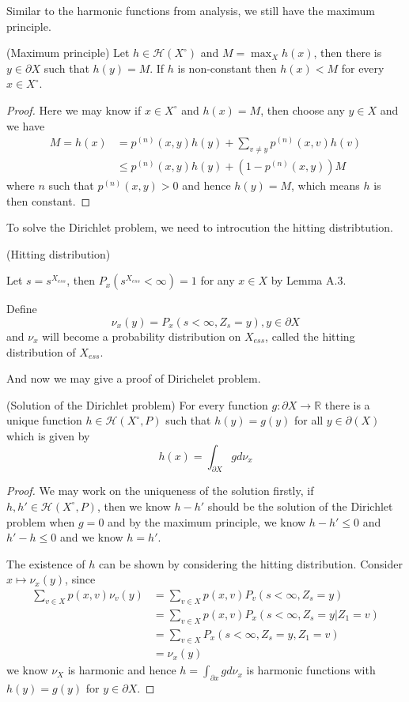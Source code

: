 \documentclass[lang=en,11pt,a4paper,citestyle =authoryear]{elegantpaper}
\newcommand{\R}{\mathbb{R}}
\newcommand{\Har}{\mathcal{H}}
\begin{document}
Similar to the harmonic functions from analysis, we still have the maximum principle.

\begin{theorem}
    (Maximum principle) Let $h \in \Har(X^{\circ})$ and $M = \max_X h(x)$, then there is $y\in \partial X$ such that $h(y) = M$. If $h$ is non-constant then $h(x) < M$ for every $x\in X^{\circ}$.
\end{theorem}
\begin{proof}
    Here we may know if $x\in X^{\circ}$ and $h(x) = M$, then choose any $y\in X$ and we have
    \[
    \begin{aligned}
    M = h(x) &= p^{(n)}(x,y)h(y) + \sum\limits_{v\neq y}p^{(n)}(x,v)h(v) \\
    &\leq p^{(n)}(x,y)h(y) + (1-p^{(n)}(x,y))M
    \end{aligned}
    \]
    where $n$ such that $p^{(n)}(x,y) > 0$ and hence $h(y) = M$, which means $h$ is then constant.
\end{proof}

To solve the Dirichlet problem, we need to introcution the hitting distribtution.

\begin{definition}
    (Hitting distribution)\par
    Let $s = s^{X_{ess}}$, then $P_x(s^{X_{ess}} < \infty) = 1$ for any $x\in X$ by Lemma A.3.\par
    Define
    \[\nu_x(y)  = P_x(s<\infty, Z_s = y), y\in\partial X\]
    and $\nu_x$ will become a probability distribution on $X_{ess}$, called the hitting distribution of $X_{ess}$.
\end{definition}

And now we may give a proof of Dirichelet problem.

\begin{theorem}
    (Solution of the Dirichlet problem) For every function $g:\partial X\to \R$ there is a unique function $h\in \Har(X^{\circ},P)$ such that $h(y) = g(y)$ for all $y\in \partial(X)$ which is given by
    \[
    h(x) = \int_{\partial X} gd\nu_x
    \]
\end{theorem}
\begin{proof}
    We may work on the uniqueness of the solution firstly, if $h,h' \in \Har(X^{\circ}, P)$, then we know $h - h'$ should be the solution of the  Dirichlet problem when $g = 0$ and by the maximum principle, we know $h-h' \leq 0$ and $h'-h\leq 0$ and we know $ h = h'$.\par
    The existence of $h$ can be shown by considering the hitting distribution. Consider $x\mapsto \nu_x(y)$, since
    \[
    \begin{aligned}
    \sum\limits_{v\in X}p(x,v)\nu_v(y) &= \sum\limits_{v\in X}p(x,v)P_v(s<\infty, Z_s = y)\\ &= \sum\limits_{v\in X}p(x,v)P_x(s<\infty, Z_s = y|Z_1 = v) \\ &= \sum\limits_{v\in X}P_x(s<\infty, Z_s = y, Z_1 = v) \\ &= \nu_x(y)
    \end{aligned}
    \]
    we know $\nu_X$ is harmonic and hence $h = \int_{\partial x}gd\nu_x$ is harmonic functions with $h(y) = g(y)$ for $y\in \partial X$.
\end{proof}
\end{document}
